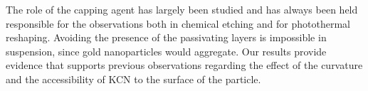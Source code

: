 \documentclass[a4paper,oneside,onecolumn]{article}
\begin{document}
The role of the capping agent has largely been studied and has always been
held responsible for the observations both in chemical etching\cite{Yuan2015}
and for photothermal reshaping\cite{Horiguchi2008}. Avoiding the presence of
the passivating layers is impossible in suspension, since gold nanoparticles
would aggregate. Our results provide evidence that supports previous
observations regarding the effect of the curvature and the accessibility of
KCN to the surface of the particle. 

{}

\end{document}
